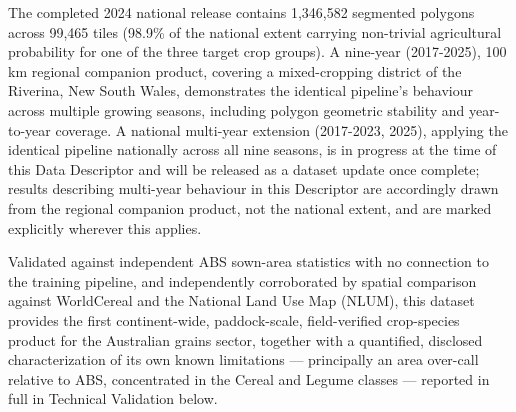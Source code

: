 The completed 2024 national release contains 1,346,582 segmented polygons across 99,465 tiles (98.9\% of the national extent carrying non-trivial agricultural probability for one of the three target crop groups). A nine-year (2017-2025), 100 km regional companion product, covering a mixed-cropping district of the Riverina, New South Wales, demonstrates the identical pipeline's behaviour across multiple growing seasons, including polygon geometric stability and year-to-year coverage. A national multi-year extension (2017-2023, 2025), applying the identical pipeline nationally across all nine seasons, is in progress at the time of this Data Descriptor and will be released as a dataset update once complete; results describing multi-year behaviour in this Descriptor are accordingly drawn from the regional companion product, not the national extent, and are marked explicitly wherever this applies.

Validated against independent ABS sown-area statistics with no connection to the training pipeline, and independently corroborated by spatial comparison against WorldCereal and the National Land Use Map (NLUM), this dataset provides the first continent-wide, paddock-scale, field-verified crop-species product for the Australian grains sector, together with a quantified, disclosed characterization of its own known limitations --- principally an area over-call relative to ABS, concentrated in the Cereal and Legume classes --- reported in full in Technical Validation below.
